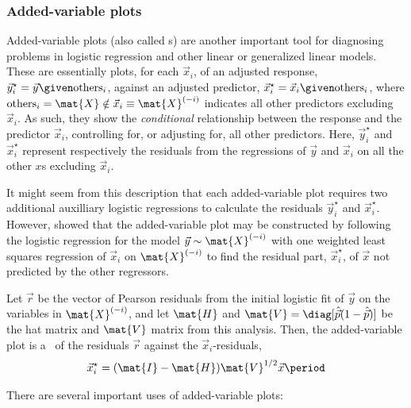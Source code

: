 \documentclass[11pt]{book}
\begin{document}
\subsubsection{Added-variable plots}
Added-variable plots \citep{CookWeisberg:99,WangP:85}
(also called s)
are another important tool for diagnosing problems in logistic
regression and other linear or generalized linear models.
These are essentially plots, for each $\vec{x}_i$, of an adjusted 
response, 
$\vec{y}_i^\star = \vec{y} \given \mbox{others}_i$,
against an adjusted predictor, 
$\vec{x}_i^\star = \vec{x}_i \given \mbox{others}_i$,
where $\mbox{others}_i = \mat{X} \notin \vec{x}_i \equiv \mat{X}^{(-i)}$ 
indicates all other predictors excluding $\vec{x}_i$.
As such, they show the \emph{conditional} relationship between the response
and the predictor $\vec{x}_i$, controlling for, or adjusting for, all other
predictors.
Here, $\vec{y}_i^\star$ and $\vec{x}_i^\star$  represent respectively
the residuals from
the regressions of $\vec{y}$ and $\vec{x}_i$ on all the other $x$s
excluding $\vec{x}_i$.

It might seem from this description that each added-variable plot requires
two additional auxilliary logistic regressions to calculate the residuals
$\vec{y}_i^\star$ and $\vec{x}_i^\star$. 
However, \citet{WangP:85}
showed that the added-variable plot may be constructed by following the logistic
regression for the model $\vec{y} \sim \mat{X}^{(-i)}$
with one weighted least squares regression of $\vec{x}_i$ on
$\mat{X}^{(-i)}$ to find the residual part, $\vec{x}_i^{\star}$,  of $\vec{x}$ not predicted
by the other regressors.

Let $\vec{r}$ be the vector of Pearson residuals from the initial logistic
fit of $\vec{y}$ on the variables in $\mat{X}^{(-i)}$,
and let $\mat{H}$ and $\mat{V} = \diag [ \hat{\vec{p}} ( 1 - \hat{\vec{p}})]$
be the hat matrix and $\mat{V}$ matrix from this analysis.
Then, the added-variable plot is a \scat\ of
the residuals $\vec{r}$ against the $\vec{x}_i$-residuals,
\begin{equation*}%
 \vec{x}_i^{\star} = ( \mat{I} - \mat{H} ) \mat{V}^{1/2} \vec{x} \period
\end{equation*}


There are several important uses of added-variable plots:
\end{document}

